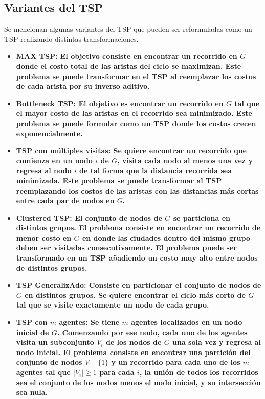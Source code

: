 \subsection*{Variantes del TSP}
Se mencionan algunas variantes del TSP que pueden ser reformuladas como un TSP realizando distintas transformaciones.
\begin{itemize}
	\item \bfseries MAX TSP\normalfont: El objetivo consiste en encontrar un recorrido en $G$ donde el costo total de las aristas del ciclo se maximizan. Este problema se puede transformar en el TSP al reemplazar los costos de cada arista por su inverso aditivo.
	\item \bfseries Bottleneck TSP\normalfont: El objetivo es encontrar un recorrido en $G$ tal que el mayor costo de las aristas en el recorrido sea minimizado. Este problema se puede formular como un TSP donde los costos crecen exponencialmente.
	\item \bfseries TSP con múltiples visitas\normalfont: Se quiere encontrar un recorrido que comienza en un nodo $i$ de $G$, visita cada nodo al menos una vez y regresa al nodo $i$ de tal forma que la distancia recorrida sea minimizada. Este problema se puede transformar al TSP reemplazando los costos de las aristas con las distancias más cortas entre cada par de nodos en $G$.
	\item \bfseries Clustered TSP\normalfont: El conjunto de nodos de $G$ se particiona en distintos grupos. El problema consiste en encontrar un recorrido de menor costo en $G$ en donde las ciudades dentro del mismo grupo deben ser visitadas consecutivamente. El problema puede ser transformado en un TSP añadiendo un costo muy alto entre nodos de distintos grupos.
	\item \bfseries TSP GeneralizAdo\normalfont: Consiste en particionar el conjunto de nodos de $G$ en distintos grupos. Se quiere encontrar el ciclo más corto de $G$ tal que se visite exactamente un nodo de cada grupo.
	\item \bfseries TSP con $m$ agentes\normalfont: Se tiene $m$ agentes localizados en un nodo inicial de $G$. Comenzando por ese nodo, cada uno de los agentes visita un subconjunto $V_i$ de los nodos de $G$ una sola vez y regresa al nodo inicial. El problema consiste en encontrar una partición del conjunto de nodos $V - \{1\}$ y un recorrido para cada uno de los $m$ agentes tal que $|V_i|\geq1 $ para cada $i$, la unión de todos los recorridos sea el conjunto de los nodos menos el nodo inicial, y su intersección sea nula.
\end{itemize}
